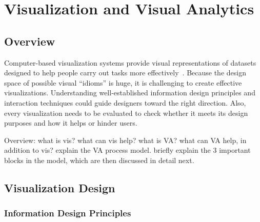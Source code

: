 \section{Visualization and Visual Analytics}

\subsection{Overview}
Computer-based visualization systems provide visual representations of datasets designed to help people carry out tasks more effectively~\cite{Munzner2014}. Because the design space of possible visual ``idioms'' is huge, it is challenging to create effective visualizations. Understanding well-established information design principles and interaction techniques could guide designers toward the right direction. Also, every visualization needs to be evaluated to check whether it meets its design purposes and how it helps or hinder users.

Overview: what is vis? what can vis help? what is VA? what can VA help, in addition to vis? explain the VA process model. briefly explain the 3 important blocks in the model, which are then discussed in detail next. 

%
%
%
%
%

\subsection{Visualization Design}


\subsubsection{Information Design Principles}
\label{sub:lr-design}

